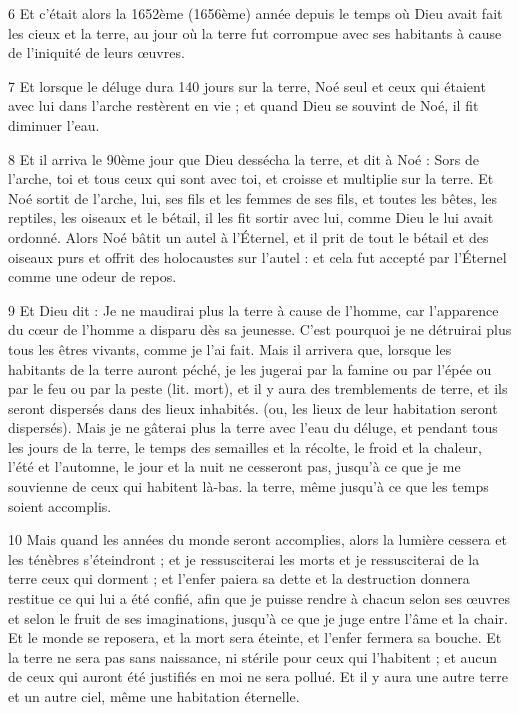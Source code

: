 \par 6 Et c'était alors la 1652ème (1656ème) année depuis le temps où Dieu avait fait les cieux et la terre, au jour où la terre fut corrompue avec ses habitants à cause de l'iniquité de leurs œuvres.

\par 7 Et lorsque le déluge dura 140 jours sur la terre, Noé seul et ceux qui étaient avec lui dans l'arche restèrent en vie ; et quand Dieu se souvint de Noé, il fit diminuer l'eau.

\par 8 Et il arriva le 90ème jour que Dieu dessécha la terre, et dit à Noé : Sors de l'arche, toi et tous ceux qui sont avec toi, et croisse et multiplie sur la terre. Et Noé sortit de l'arche, lui, ses fils et les femmes de ses fils, et toutes les bêtes, les reptiles, les oiseaux et le bétail, il les fit sortir avec lui, comme Dieu le lui avait ordonné. Alors Noé bâtit un autel à l'Éternel, et il prit de tout le bétail et des oiseaux purs et offrit des holocaustes sur l'autel : et cela fut accepté par l'Éternel comme une odeur de repos.

\par 9 Et Dieu dit : Je ne maudirai plus la terre à cause de l'homme, car l'apparence du cœur de l'homme a disparu dès sa jeunesse. C'est pourquoi je ne détruirai plus tous les êtres vivants, comme je l'ai fait. Mais il arrivera que, lorsque les habitants de la terre auront péché, je les jugerai par la famine ou par l'épée ou par le feu ou par la peste (lit. mort), et il y aura des tremblements de terre, et ils seront dispersés dans des lieux inhabités. (ou, les lieux de leur habitation seront dispersés). Mais je ne gâterai plus la terre avec l'eau du déluge, et pendant tous les jours de la terre, le temps des semailles et la récolte, le froid et la chaleur, l'été et l'automne, le jour et la nuit ne cesseront pas, jusqu'à ce que je me souvienne de ceux qui habitent là-bas. la terre, même jusqu'à ce que les temps soient accomplis.

\par 10 Mais quand les années du monde seront accomplies, alors la lumière cessera et les ténèbres s'éteindront ; et je ressusciterai les morts et je ressusciterai de la terre ceux qui dorment ; et l'enfer paiera sa dette et la destruction donnera restitue ce qui lui a été confié, afin que je puisse rendre à chacun selon ses œuvres et selon le fruit de ses imaginations, jusqu'à ce que je juge entre l'âme et la chair. Et le monde se reposera, et la mort sera éteinte, et l'enfer fermera sa bouche. Et la terre ne sera pas sans naissance, ni stérile pour ceux qui l'habitent ; et aucun de ceux qui auront été justifiés en moi ne sera pollué. Et il y aura une autre terre et un autre ciel, même une habitation éternelle.

